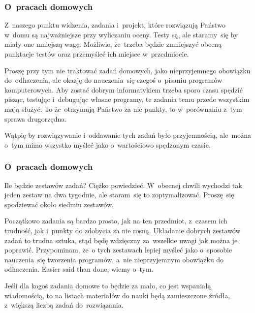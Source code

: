 \documentclass[10pt,t]{beamer}
\begin{document}
\begin{frame}
  \frametitle{O~pracach domowych}


  Z~naszego punktu widzenia, zadania i~projekt, które rozwiązują Państwo
  w~domu są najważniejsze przy wyliczaniu oceny. Testy są, ale staramy~się
  by miały one mniejszą wagę. Możliwie, że~trzeba będzie zmniejszyć
  obecną punktacje testów oraz przemyśleć ich miejsce w~przedmiocie.

  Proszę przy tym nie traktować zadań domowych, jako nieprzyjemnego
  obowiązku do~odhaczenia, ale okazję do nauczenia~się czegoś o~pisaniu
  programów komputerowych. Aby zostać dobrym informatykiem trzeba sporo
  czasu spędzić pisząc, testując i~debugując własne programy, te zadania
  temu przede wszystkim mają służyć. To że~otrzymują Państwo za nie punkty,
  to w~porównaniu z~tym sprawa drugorzędna.

  Wątpię by rozwiązywanie i~oddawanie tych zadań było przyjemnością,
  ale~można o~tym mimo wszystko myśleć jako o~wartościowo spędzonym czasie.

\end{frame}





\begin{frame}
  \frametitle{O~pracach domowych}


  Ile będzie zestawów zadań? Ciężko powiedzieć. W~obecnej chwili wychodzi
  tak jeden zestaw na dwa tygodnie, ale staram~się to zoptymalizować.
  Proszę~się spodziewać około siedmiu zestawów.

  Początkowo zadania są bardzo prosto, jak na ten przedmiot, z~czasem ich
  trudność, jak i~punkty do zdobycia za nie rosną. Układanie dobrych
  zestawów zadań to trudna sztuka, stąd będę wdzięczny za~wszelkie uwagi
  jak można je poprawić. Przypominam, że~o tych zestawach lepiej myśleć
  jako o~sposobie nauczenia~się tworzenia programów, a~nie nieprzyjemnym
  obowiązku do odhaczenia. Easier said than done, wiemy o~tym.

  Jeśli dla kogoś zadania domowe to będzie za mało, co jest wspaniałą
  wiadomością, to na listach materiałów do nauki będą zamieszczone źródła,
  z~większą liczbą zadań do~rozwiązania.

\end{frame}
\end{document}
